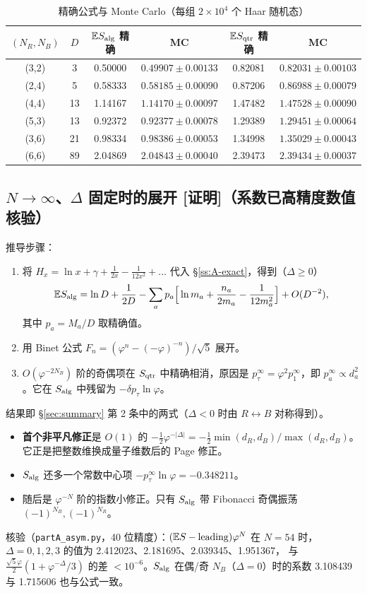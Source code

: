 \documentclass[11pt,a4paper,UTF8]{ctexart}
\newcommand{\E}{\mathbb{E}}
\newcommand{\Salg}{S_{\rm alg}}
\newcommand{\Sqtr}{S_{\rm qtr}}
\newcommand{\code}[1]{\texttt{#1}}
\newcommand{\tagP}{\texorpdfstring{\textcolor{cP}{\textbf{[证明]}}}{[证明]}}
\begin{document}
\begin{table}[htbp]
\centering\small
\caption{精确公式与 Monte Carlo（每组 $2\times10^4$ 个 Haar 随机态）}
\begin{tabular}{cccccc}
\toprule
$(N_R,N_B)$ & $D$ & $\E\Salg$ 精确 & MC & $\E\Sqtr$ 精确 & MC\\
\midrule
(3,2) & 3  & 0.50000 & $0.49907\pm0.00133$ & 0.82081 & $0.82031\pm0.00103$\\
(2,4) & 5  & 0.58333 & $0.58185\pm0.00090$ & 0.87206 & $0.86988\pm0.00079$\\
(4,4) & 13 & 1.14167 & $1.14170\pm0.00097$ & 1.47482 & $1.47528\pm0.00090$\\
(5,3) & 13 & 0.92372 & $0.92377\pm0.00078$ & 1.29389 & $1.29451\pm0.00064$\\
(3,6) & 21 & 0.98334 & $0.98386\pm0.00053$ & 1.34998 & $1.35029\pm0.00043$\\
(6,6) & 89 & 2.04869 & $2.04843\pm0.00040$ & 2.39473 & $2.39434\pm0.00037$\\
\bottomrule
\end{tabular}
\end{table}

\subsection{\texorpdfstring{$N\to\infty$、$\Delta$}{N→∞、Δ} 固定时的展开 \tagP（系数已高精度数值核验）}\label{ss:A-asym}
推导步骤：
\begin{enumerate}
  \item 将 $H_x=\ln x+\gamma+\frac1{2x}-\frac1{12x^2}+\dots$ 代入 \S\ref{ss:A-exact}，得到（$\Delta\ge0$）
  \[
  \E\Salg=\ln D+\frac1{2D}-\sum_ap_a\Big[\ln m_a+\frac{n_a}{2m_a}-\frac1{12m_a^2}\Big]+O(D^{-2}),
  \]
  其中 $p_a=M_a/D$ 取精确值。
  \item 用 Binet 公式 $F_n=(\varphi^n-(-\varphi)^{-n})/\sqrt5$ 展开。
  \item $O(\varphi^{-2N_B})$ 阶的奇偶项在 $\Sqtr$ 中精确相消，原因是 $p_\tau^\infty=\varphi^2p_1^\infty$，即 $p_a^\infty\propto d_a^2$。它在 $\Salg$ 中残留为 $-\delta p_\tau\ln\varphi$。
\end{enumerate}
结果即 \S\ref{sec:summary} 第 2 条中的两式（$\Delta<0$ 时由 $R\leftrightarrow B$ 对称得到）。
\begin{itemize}
  \item \textbf{首个非平凡修正}是 $O(1)$ 的 $-\tfrac12\varphi^{-|\Delta|}=-\tfrac12\min(d_R,d_B)/\max(d_R,d_B)$。它正是把整数维换成量子维数后的 Page 修正。
  \item $\Salg$ 还多一个常数中心项 $-p_\tau^\infty\ln\varphi=-0.348211$。
  \item 随后是 $\varphi^{-N}$ 阶的指数小修正。只有 $\Salg$ 带 Fibonacci 奇偶振荡 $(-1)^{N_B},(-1)^{N_R}$。
\end{itemize}
核验（\code{partA\_asym.py}，40 位精度）：$(\E S-{\rm leading})\varphi^N$ 在 $N=54$ 时，$\Delta=0,1,2,3$ 的值为 2.412023、2.181695、2.039345、1.951367，
与 $\frac{\sqrt5\varphi}{2}(1+\varphi^{-\Delta}/3)$ 的差 $<10^{-6}$。$\Salg$ 在偶/奇 $N_B$（$\Delta=0$）时的系数 3.108439 与 1.715606 也与公式一致。
\end{document}
